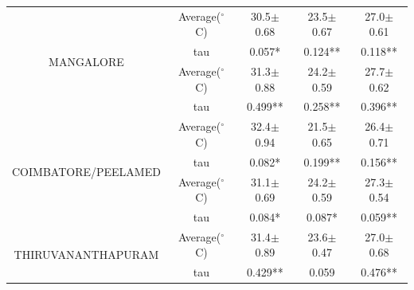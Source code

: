 \documentclass{article}
\begin{document}
\begin{tabular}{|c|c|c|c|c|}
\multirow{4}{*}{MANGALORE}&Average($^\circ$ C)&30.5$\pm$0.68&23.5$\pm$0.67&27.0$\pm$0.61\\ 
&tau& 0.057*&0.124**&0.118**\\ \hline
\multirow{4}{*}{KOZHIKODE}&Average($^\circ$ C)&31.3$\pm$0.88&24.2$\pm$0.59&27.7$\pm$0.62\\ 
&tau&0.499**&0.258**&0.396**\\ \hline
\multirow{4}{*}{COIMBATORE/PEELAMED}&Average($^\circ$ C)&32.4$\pm$0.94&21.5$\pm$0.65&26.4$\pm$0.71\\ 
&tau& 0.082*&0.199**&0.156**\\ \hline
\multirow{4}{*}{FORT COCHIN}&Average($^\circ$ C)&31.1$\pm$0.69&24.2$\pm$0.59&27.3$\pm$0.54\\ 
&tau& 0.084*& 0.087*&0.059**\\ \hline
\multirow{4}{*}{THIRUVANANTHAPURAM}&Average($^\circ$ C)&31.4$\pm$0.89&23.6$\pm$0.47&27.0$\pm$0.68\\ 
&tau&0.429**&0.059&0.476**\\ \hline
\end{tabular}
\end{document}
